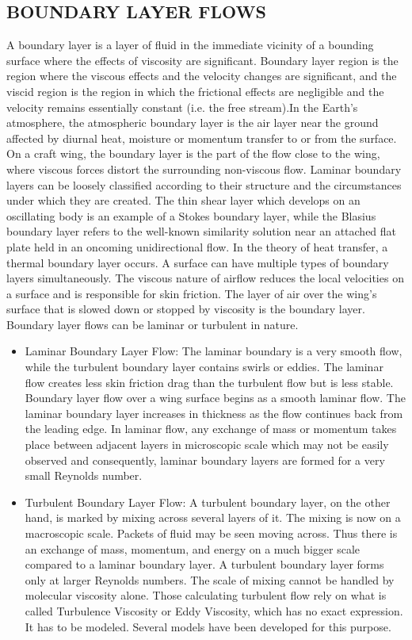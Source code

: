 \documentclass[a4paper,12pt]{report}
\begin{document}
{\subsection{BOUNDARY LAYER FLOWS}
A boundary layer is a layer of fluid in the immediate vicinity of a bounding surface where the effects of viscosity are significant. Boundary layer region is the region where the viscous effects and the velocity changes are significant, and the viscid region is the region in which the frictional effects are negligible and the velocity remains essentially constant (i.e. the free stream).In the Earth’s atmosphere, the atmospheric boundary layer is the air layer near the ground affected by diurnal heat, moisture or momentum transfer to or from the surface. On a craft wing, the boundary layer is the part of the flow close to the wing, where viscous forces distort the surrounding non-viscous flow. Laminar boundary layers can be loosely classified according to their structure and the circumstances under which they are created. The thin shear layer which develops on an oscillating body is an example of a Stokes boundary layer, while the Blasius boundary layer refers to the well-known similarity solution near an attached flat plate held in an oncoming unidirectional flow. In the theory of heat transfer, a thermal boundary layer occurs. A surface can have multiple types of boundary layers simultaneously. The viscous nature of airflow reduces the local velocities on a surface and is responsible for skin friction. The layer of air over the wing’s surface that is slowed down or stopped by viscosity is the boundary layer. Boundary layer flows can be laminar or turbulent in nature.
\begin{itemize}
	\item Laminar Boundary Layer Flow: The laminar boundary is a very smooth flow, while the turbulent boundary layer contains swirls or eddies. The laminar flow creates less skin friction drag than the turbulent flow but is less stable. Boundary layer flow over a wing surface begins as a smooth laminar flow. The laminar boundary layer increases in thickness as the flow continues back from the leading edge. In laminar flow, any exchange of mass or momentum takes place between adjacent layers in microscopic scale which may not be easily observed and consequently, laminar boundary layers are formed for a very small Reynolds number.
	\item Turbulent Boundary Layer Flow: A turbulent boundary layer, on the other hand, is marked by mixing across several layers of it. The mixing is now on a macroscopic scale. Packets of fluid may be seen moving across. Thus there is an exchange of mass, momentum, and energy on a much bigger scale compared to a laminar boundary layer. A turbulent boundary layer forms only at larger Reynolds numbers. The scale of mixing cannot be handled by molecular viscosity alone. Those calculating turbulent flow rely on what is called Turbulence Viscosity or Eddy Viscosity, which has no exact expression. It has to be modeled. Several models have been developed for this purpose.
\end{itemize}
}
\end{document}
